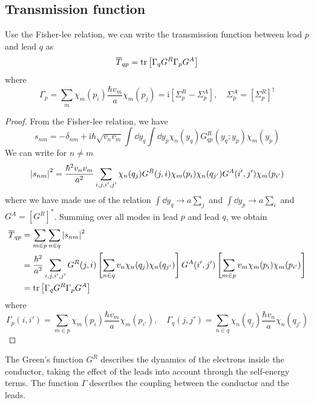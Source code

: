 \documentclass[11pt,a4paper]{book}
\theoremstyle{plain}
\theoremstyle{definition}
\theoremstyle{remark}
\newcommand{\ii}{\mathrm{i}}                      %
\begin{document}
\subsection{Transmission function}
Use the Fisher-lee relation, we can write the transmission function between lead $p$ and lead $q$ as
\begin{equation}\label{eq:transmission_green}
    \overline{T}_{qp} = \trace \left[ \Gamma_q G^R \Gamma_p G^A \right]
\end{equation}
where
\begin{equation}
    \Gamma_p = \sum_m \chi_m(p_i)\frac{\hbar v_m}{a} \chi_m(p_j) = \ii \left[\Sigma^R_p - \Sigma^A_p \right], \quad \Sigma^A_p = \left[\Sigma^R_p\right]^\dagger
\end{equation}
\begin{proof}
    From the Fisher-lee relation, we have
    \begin{equation}
        s_{nm} = -\delta_{nm} + \ii \hbar \sqrt{v_n v_m} \int \dd y_q \int \dd y_p \chi_n(y_q) G^R_{qp}(y_q; y_p) \chi_m(y_p)
    \end{equation}
    We can write for $n \neq m$
    \begin{equation}
        \abs{s_{nm}}^2 = \frac{\hbar^2 v_n v_m}{a^2} \sum_{i,j,i',j'} \chi_n(q_j) G^R(j,i) \chi_m(p_i) \chi_n(q_{j'})G^A(i',j') \chi_m(p_{i'})
    \end{equation}
    where we have made use of the relation $\int \dd y_q \to a \sum_j$ and $\int \dd y_p \to a \sum_i$ and $G^A = [G^R]^*$. Summing over all modes in lead $p$ and lead $q$, we obtain
    \begin{equation}
        \begin{aligned}
            \overline{T}_{qp} & = \sum_{m \in p} \sum_{n \in q} \abs{s_{nm}}^2 \\
            & = \frac{\hbar^2}{a^2} \sum_{i,j,i',j'} G^R(j,i) \left[\sum_{n \in q} v_n \chi_n(q_j) \chi_n(q_{j'}) \right] G^A(i',j') \left[\sum_{m \in p} v_m \chi_m(p_i) \chi_m(p_{i'}) \right] \\
            & = \trace \left[ \Gamma_q G^R \Gamma_p G^A \right]
        \end{aligned}
    \end{equation}
    where \begin{equation}
        \Gamma_p(i,i') = \sum_{m \in p} \chi_m(p_i) \frac{\hbar v_m}{a} \chi_m(p_{i'}), \quad \Gamma_q(j,j') = \sum_{n \in q} \chi_n(q_j) \frac{\hbar v_n}{a} \chi_n(q_{j'})
    \end{equation}
\end{proof}
The Green's function $G^R$ describes the dynamics of the electrons inside the conductor, taking the effect of the leads into account through the self-energy terms. The function $\Gamma$ describes the coupling between the conductor and the leads.
\end{document}

